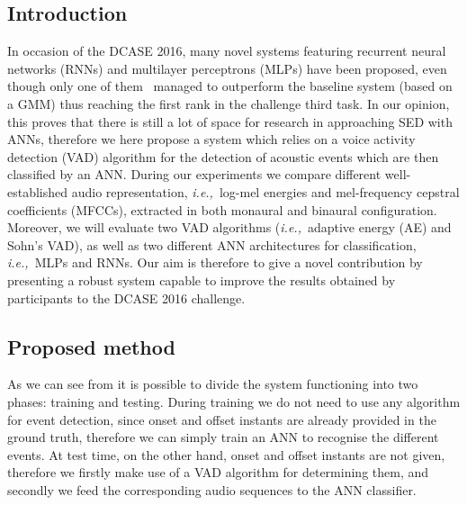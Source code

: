 \subsection{Introduction}

In occasion of the DCASE 2016, many novel systems featuring recurrent neural networks (RNNs) and multilayer perceptrons (MLPs) have been proposed, even though only one of them~\cite{adavanne2016sound} managed to outperform the baseline system (based on a GMM) thus reaching the first rank in the challenge third task. In our opinion, this proves that there is still a lot of space for research in approaching SED with ANNs, therefore we here propose a system which relies on a voice activity detection (VAD) algorithm for the detection of acoustic events which are then classified by an ANN. During our experiments we compare different well-established audio representation, \emph{i.e.,}\ log-mel energies and mel-frequency cepstral coefficients (MFCCs), extracted in both monaural and binaural configuration. Moreover, we will evaluate two VAD algorithms (\emph{i.e.,}\ adaptive energy (AE) and Sohn's VAD), as well as two different ANN architectures for classification, \emph{i.e.,}\ MLPs and RNNs. Our aim is therefore to give a novel contribution by presenting a robust system capable to improve the results obtained by participants to the DCASE 2016 challenge.


\subsection{Proposed method}

As we can see from  it is possible to divide the system functioning into two phases: training and testing. During training we do not need to use any algorithm for event detection, since onset and offset instants are already provided in the ground truth, therefore we can simply train an ANN to recognise the different events. At test time, on the other hand, onset and offset instants are not given, therefore we firstly make use of a VAD algorithm for determining them, and secondly we feed the corresponding audio sequences to the ANN classifier.

